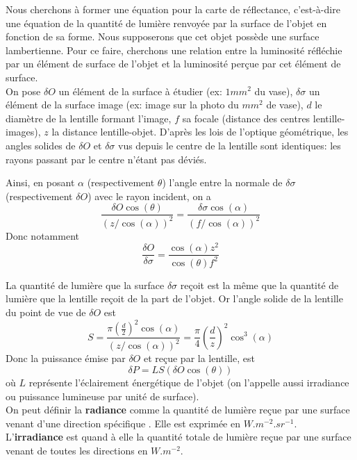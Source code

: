Nous cherchons à former une équation pour la carte de réflectance, c'est-à-dire une équation de la quantité de lumière renvoyée par la surface de l’objet en fonction de sa forme. Nous supposerons que cet objet possède une surface lambertienne. Pour ce faire, cherchons une relation entre la luminosité réfléchie par un élément de surface de l'objet et la luminosité perçue par cet élément de surface. \\

On pose $\delta O$ un élément de la surface à étudier (ex: $1mm^2$ du vase), $\delta \sigma$ un élément de la surface image (ex: image sur la photo du $mm^2$ de vase), $d$ le diamètre de la lentille formant l'image, $f$ sa focale (distance des centres lentille-images), $z$ la distance lentille-objet.
D'après les lois de l'optique géométrique, les angles solides de \(\delta O\) et $\delta \sigma$ vus depuis le centre de la lentille sont identiques: les rayons passant par le centre n'étant pas déviés. 

Ainsi, en posant $\alpha$ (respectivement $\theta$) l'angle entre la normale de $\delta \sigma$ (respectivement $\delta O$) avec le rayon incident, on a
\begin{equation*}
    \frac{\delta O \cos(\theta)}{(z/\cos(\alpha))^2}=\frac{\delta\sigma \cos(\alpha)}{(f/\cos(\alpha))^2}
\end{equation*}
Donc notamment 
\begin{equation*}
    \frac{\delta O}{\delta\sigma}=\frac{\cos(\alpha)z^2}{\cos(\theta)f^2}
\end{equation*}

La quantité de lumière que la surface $\delta\sigma$ reçoit est la même que la quantité de lumière que la lentille reçoit de la part de l'objet. Or l'angle solide de la lentille du point de vue de $\delta O$ est 
\begin{equation*}
    S=\frac{\pi \left(\frac{d}{2}\right)^2\cos(\alpha)}{(z/\cos(\alpha))^2}=\frac{\pi}{4}\left(\frac{d}{z}\right)^2\cos^3(\alpha)
\end{equation*}
Donc la puissance émise par $\delta O$ et reçue par la lentille, est 
\begin{equation*}
    \delta P= LS (\delta O\cos(\theta))
\end{equation*}
où $L$ représente l'éclairement énergétique de l'objet (on l'appelle aussi irradiance ou puissance lumineuse par unité de surface).\\
On peut définir la \textbf{radiance} comme \og la quantité de lumière reçue par une surface venant d'une direction spécifique \fg. Elle est exprimée en $W.m^{-2}.sr^{-1}$. L'\textbf{irradiance} est quand à elle \og la quantité totale de lumière reçue par une surface venant de toutes les directions\fg{} en $W.m^{-2}$.

